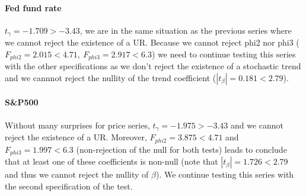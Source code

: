 \documentclass[hidelinks,12pts]{article}
\DeclareMathOperator{\1}{\mathbbm{1}}
\begin{document}



\paragraph{Fed fund rate}  
$t_\gamma = -1.709 > -3.43$, we are in the same situation as the previous series where we cannot reject the existence of a UR. 
Because we cannot reject phi2 nor phi3 ($F_{phi2} = 2.015 <4.71, \: F_{phi3} = 2.917 <6.3$) we need to continue testing this series with the other specifications as we don't reject the existence of a stochastic trend and we cannnot reject the nullity of the trend coefficient ($|t_\beta| = 0.181 < 2.79$).


\paragraph{S\&P500}
Without many surprises for price series, $t_\gamma = -1.975 > -3.43$ and we cannot reject the existence of a UR. 
Moreover, $F_{phi2} = 3.875< 4.71$ and $F_{phi3} = 1.997 < 6.3$ (non-rejection of the null for both tests) leads to conclude that at least one of these coefficients is non-null (note that $|t_\beta| = 1.726 < 2.79$ and thus we cannot reject the nullity of $\beta$). 
We continue testing this series with the second specification of the test.

\end{document}
